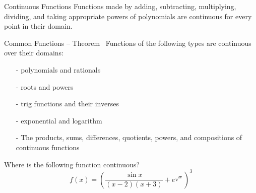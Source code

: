 \begin{frame}[t]{Continuous Functions}
Functions made by adding, subtracting, multiplying, dividing, and taking appropriate powers of polynomials are continuous for every point \alert{in their domain}.



\end{frame}
\begin{frame}[t]
\begin{block}{Common Functions -- Theorem~}
Functions of the following types are continuous over their domains:
\begin{itemize}
\item[-] polynomials and rationals
\item[-] roots and powers
\item[-] trig functions and their inverses
\item[-] exponential and logarithm
\item[-] The products, sums, differences, quotients, powers, and compositions of continuous functions
\end{itemize}
\end{block}
\end{frame}
\begin{frame}[t]
Where is the following function continuous?
\[f(x)=\left(\frac{\sin x}{(x-2)(x+3)} + e^{\sqrt{x}}\right)^3\]

\onslide<2|handout:0>{\color{C3}
Over its domain: $[0,2) \cup (2, \infty)$.
}
\end{frame}
